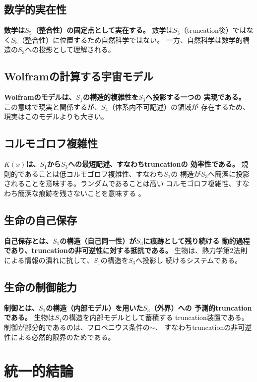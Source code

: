 \documentclass[11pt,a4paper]{ltjsarticle}
\theoremstyle{remark}
\begin{document}
\subsection{数学的実在性}

\textbf{数学は$S_5$（整合性）の固定点として実在する。}
数学は$S_3$（truncation後）ではなく$S_5$（整合性）に位置するため自然科学ではない。
一方、自然科学は数学的構造の$S_3$への投影として理解される。

\subsection{Wolframの計算する宇宙モデル}

\textbf{Wolframのモデルは、$S_1$の構造的複雑性を$S_3$へ投影する一つの
実現である。} この意味で現実と関係するが、$S_4$（体系内不可記述）の領域が
存在するため、現実はこのモデルよりも大きい\cite{Wolfram2020}。

\subsection{コルモゴロフ複雑性}

\textbf{$K(x)$は、$S_1$から$S_3$への最短記述、すなわちtruncationの
効率性である。} 規則的であることは低コルモゴロフ複雑性、すなわち$S_1$の
構造が$S_3$へ簡潔に投影されることを意味する。ランダムであることは高い
コルモゴロフ複雑性、すなわち簡潔な痕跡を残さないことを意味する
\cite{LiVitanyi2008,GrunwaldVitanyi2008}。

\subsection{生命の自己保存}

\textbf{自己保存とは、$S_1$の構造（自己同一性）が$S_3$に痕跡として残り続ける
動的過程であり、truncationの非可逆性に対する抵抗である。}
生物は、熱力学第2法則による情報の潰れに抗して、$S_1$の構造を$S_3$へ投影し
続けるシステムである。

\subsection{生命の制御能力}

\textbf{制御とは、$S_1$の構造（内部モデル）を用いた$S_3$（外界）への
予測的truncationである。} 生物は$S_1$の構造を内部モデルとして蓄積する
truncation装置である。制御が部分的であるのは、フロベニウス条件の$\sim$、
すなわちtruncationの非可逆性による必然的限界のためである。

\section{統一的結論}
\end{document}
